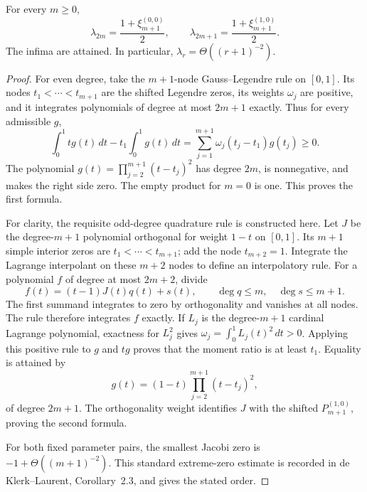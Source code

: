 \begin{theorem}
For every $m\ge0$,
\begin{equation}
 \lambda_{2m}=\frac{1+\xi_{m+1}^{(0,0)}}2,
 \qquad
 \lambda_{2m+1}=\frac{1+\xi_{m+1}^{(1,0)}}2.
 \label{eq:p9-exact-lambda}
\end{equation}
The infima are attained. In particular,
$\lambda_r=\Theta((r+1)^{-2})$.
\end{theorem}
\begin{proof}
For even degree, take the $m+1$-node Gauss--Legendre rule on $[0,1]$.
Its nodes $t_1<\cdots<t_{m+1}$ are the shifted Legendre zeros, its
weights $\omega_j$ are positive, and it integrates polynomials of degree
at most $2m+1$ exactly. Thus for every admissible $g$,
\[
 \int_0^1 t g(t)\,dt-t_1\int_0^1g(t)\,dt
  =\sum_{j=1}^{m+1}\omega_j(t_j-t_1)g(t_j)\ge0.
\]
The polynomial $g(t)=\prod_{j=2}^{m+1}(t-t_j)^2$ has degree $2m$,
is nonnegative, and makes the right side zero. The empty product for
$m=0$ is one. This proves the first formula.

For clarity, the requisite odd-degree quadrature rule is constructed here.
Let $J$ be the degree-$m+1$ polynomial orthogonal for weight $1-t$ on
$[0,1]$. Its $m+1$ simple interior zeros are $t_1<\cdots<t_{m+1}$;
add the node $t_{m+2}=1$. Integrate the Lagrange interpolant on these
$m+2$ nodes to define an interpolatory rule. For a polynomial $f$ of
degree at most $2m+2$, divide
\[
 f(t)=(t-1)J(t)q(t)+s(t),\qquad
 \deg q\le m,\quad\deg s\le m+1.
\]
The first summand integrates to zero by orthogonality and vanishes at all
nodes. The rule therefore integrates $f$ exactly. If $L_j$ is the
degree-$m+1$ cardinal Lagrange polynomial, exactness for $L_j^2$ gives
$\omega_j=\int_0^1L_j(t)^2\,dt>0$.
Applying this positive rule to $g$ and $tg$ proves that the moment ratio
is at least $t_1$. Equality is attained by
\[
 g(t)=(1-t)\prod_{j=2}^{m+1}(t-t_j)^2,
\]
of degree $2m+1$. The orthogonality weight identifies $J$ with the
shifted $P_{m+1}^{(1,0)}$, proving the second formula.

For both fixed parameter pairs, the smallest Jacobi zero is
$-1+\Theta((m+1)^{-2})$. This standard extreme-zero estimate is recorded
in de Klerk--Laurent, Corollary~2.3, and gives the stated order.
\end{proof}

